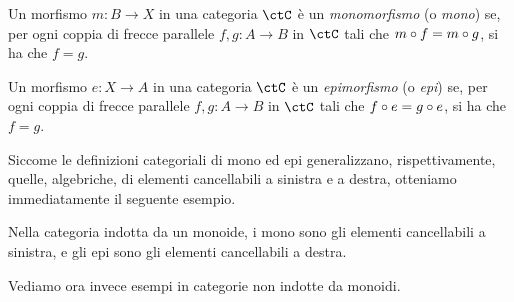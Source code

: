\begin{definition}[Monomorfismo]\label{def_Mono}
	Un morfismo \(m \colon B \to X\) in una categoria \(\ctC\) è un \emph{monomorfismo} (o \emph{mono}) se,
	per ogni coppia di frecce parallele \(f, g \colon A \to B\) in \(\ctC\) tali che \(m \circ f = m \circ g\), si ha che \(f = g\).
\end{definition}

\begin{definition}[Epimorfismo]\label{def_Epi}
	Un morfismo \(e \colon X \to A\) in una categoria \(\ctC\) è un \emph{epimorfismo} (o \emph{epi}) se,
	per ogni coppia di frecce parallele \(f, g \colon A \to B\) in \(\ctC\) tali che \(f \circ e = g \circ e\), si ha che \(f = g\).
\end{definition}

Siccome le definizioni categoriali di mono ed epi generalizzano, rispettivamente, quelle, algebriche, di elementi cancellabili a sinistra e a destra,
otteniamo immediatamente il seguente esempio.

\begin{example}
	Nella categoria indotta da un monoide, i mono sono gli elementi cancellabili a sinistra,
	e gli epi sono gli elementi cancellabili a destra.
\end{example}

Vediamo ora invece esempi in categorie non indotte da monoidi.

